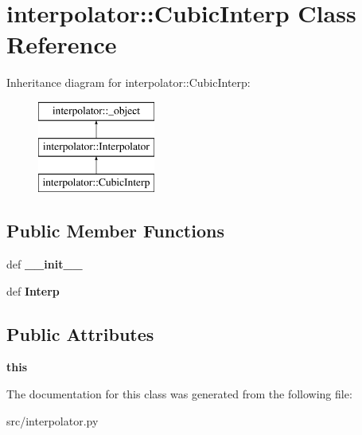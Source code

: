\hypertarget{classinterpolator_1_1CubicInterp}{
\section{interpolator::CubicInterp Class Reference}
\label{d6/dab/classinterpolator_1_1CubicInterp}
}
Inheritance diagram for interpolator::CubicInterp:\begin{figure}[H]
\begin{center}
\leavevmode
\includegraphics[height=3cm]{d6/dab/classinterpolator_1_1CubicInterp}
\end{center}
\end{figure}
\subsection*{Public Member Functions}
\begin{DoxyCompactItemize}
\item 
\hypertarget{classinterpolator_1_1CubicInterp_a8459c3cc860867050307b5c585c66c17}{
def {\bfseries \_\-\_\-init\_\-\_\-}}
\label{d6/dab/classinterpolator_1_1CubicInterp_a8459c3cc860867050307b5c585c66c17}

\item 
\hypertarget{classinterpolator_1_1CubicInterp_a687acfea9e0e656291277a79efda8a01}{
def {\bfseries Interp}}
\label{d6/dab/classinterpolator_1_1CubicInterp_a687acfea9e0e656291277a79efda8a01}

\end{DoxyCompactItemize}
\subsection*{Public Attributes}
\begin{DoxyCompactItemize}
\item 
\hypertarget{classinterpolator_1_1CubicInterp_a6929d792f1361b0c3e60a68814773b12}{
{\bfseries this}}
\label{d6/dab/classinterpolator_1_1CubicInterp_a6929d792f1361b0c3e60a68814773b12}

\end{DoxyCompactItemize}


The documentation for this class was generated from the following file:\begin{DoxyCompactItemize}
\item 
src/interpolator.py\end{DoxyCompactItemize}
